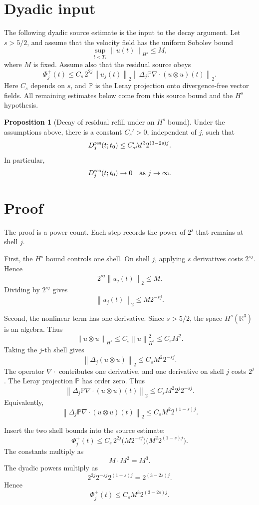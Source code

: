\documentclass[11pt]{article}
\newcommand{\norm}[1]{\left\lVert #1\right\rVert}
\theoremstyle{definition}
\newtheorem*{proposition}{Proposition}
\begin{document}
\section*{Dyadic input}

The following dyadic source estimate is the input to the decay argument. Let
\(s>5/2\), and assume that the
velocity field has the uniform Sobolev bound
\[
\sup_{t<T_*}\norm{u(t)}_{H^s}\le M,
\]
where \(M\) is fixed. Assume also that the residual source obeys
\[
\Phi_j^+(t)
\le
C_s\,2^{2j}
\norm{u_j(t)}_2
\norm{\Delta_j\mathbb P\nabla\cdot(u\otimes u)(t)}_2 .
\]
Here \(C_s\) depends on \(s\), and \(\mathbb P\) is the Leray projection onto
divergence-free vector fields. All remaining estimates below come from this
source bound and the \(H^s\) hypothesis.

\begin{proposition}[Decay of residual refill under an \(H^s\) bound]
Under the assumptions above, there is a constant \(C_s'>0\), independent of
\(j\), such that
\[
D_j^{\rm res}(t;t_0)
\le
C_s' M^3 2^{(3-2s)j}.
\]
In particular,
\[
D_j^{\rm res}(t;t_0)\to0
\quad\text{as }j\to\infty.
\]
\end{proposition}

\section*{Proof}

The proof is a power count. Each step records the power of \(2^j\) that remains
at shell \(j\).

First, the \(H^s\) bound controls one shell. On shell \(j\), applying \(s\)
derivatives costs \(2^{sj}\). Hence
\[
2^{sj}\norm{u_j(t)}_2\le M.
\]
Dividing by \(2^{sj}\) gives
\[
\norm{u_j(t)}_2\le M2^{-sj}.
\]

Second, the nonlinear term has one derivative. Since \(s>5/2\), the space
\(H^s(\mathbb R^3)\) is an algebra. Thus
\[
\norm{u\otimes u}_{H^s}
\le
C_s\norm{u}_{H^s}^2
\le
C_sM^2.
\]
Taking the \(j\)-th shell gives
\[
\norm{\Delta_j(u\otimes u)}_2
\le
C_sM^2 2^{-sj}.
\]
The operator \(\nabla\cdot\) contributes one derivative, and one derivative on
shell \(j\) costs \(2^j\). The Leray projection \(\mathbb P\) has order zero.
Thus
\[
\norm{\Delta_j\mathbb P\nabla\cdot(u\otimes u)(t)}_2
\le
C_sM^2 2^j2^{-sj}.
\]
Equivalently,
\[
\norm{\Delta_j\mathbb P\nabla\cdot(u\otimes u)(t)}_2
\le
C_sM^2 2^{(1-s)j}.
\]

Insert the two shell bounds into the source estimate:
\[
\Phi_j^+(t)
\le
C_s\,2^{2j}
\bigl(M2^{-sj}\bigr)
\bigl(M^2 2^{(1-s)j}\bigr).
\]
The constants multiply as
\[
M\cdot M^2=M^3.
\]
The dyadic powers multiply as
\[
2^{2j}2^{-sj}2^{(1-s)j}
=
2^{(3-2s)j}.
\]
Hence
\[
\Phi_j^+(t)\le C_sM^3 2^{(3-2s)j}.
\]
\end{document}
